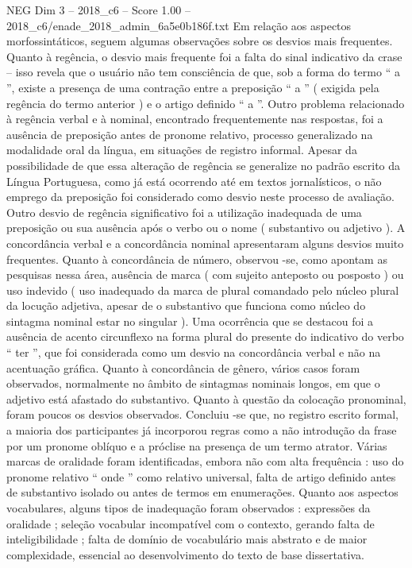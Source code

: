 \begin{textsample}{NEG Dim 3 – 2018\_c6 – Score 1.00 – 2018\_c6/enade\_2018\_admin\_6a5e0b186f.txt}
Em relação aos aspectos morfossintáticos, seguem algumas observações sobre os desvios mais frequentes.
Quanto à regência, o desvio mais frequente foi a falta do sinal indicativo da crase – isso revela que o usuário não tem consciência de que, sob a forma do termo “ a ”, existe a presença de uma contração entre a preposição “ a ” ( exigida pela regência do termo anterior ) e o artigo definido “ a ”.
Outro problema relacionado à regência verbal e à nominal, encontrado frequentemente nas respostas, foi a ausência de preposição antes de pronome relativo, processo generalizado na modalidade oral da língua, em situações de registro informal.
Apesar da possibilidade de que essa alteração de regência se generalize no padrão escrito da Língua Portuguesa, como já está ocorrendo até em textos jornalísticos, o não emprego da preposição foi considerado como desvio neste processo de avaliação.
Outro desvio de regência significativo foi a utilização inadequada de uma preposição ou sua ausência após o verbo ou o nome ( substantivo ou adjetivo ).
A concordância verbal e a concordância nominal apresentaram alguns desvios muito frequentes.
Quanto à concordância de número, observou -se, como apontam as pesquisas nessa área, ausência de marca ( com sujeito anteposto ou posposto ) ou uso indevido ( uso inadequado da marca de plural comandado pelo núcleo plural da locução adjetiva, apesar de o substantivo que funciona como núcleo do sintagma nominal estar no singular ).
Uma ocorrência que se destacou foi a ausência de acento circunflexo na forma plural do presente do indicativo do verbo “ ter ”, que foi considerada como um desvio na concordância verbal e não na acentuação gráfica.
Quanto à concordância de gênero, vários casos foram observados, normalmente no âmbito de sintagmas nominais longos, em que o adjetivo está afastado do substantivo.
Quanto à questão da colocação pronominal, foram poucos os desvios observados.
Concluiu -se que, no registro escrito formal, a maioria dos participantes já incorporou regras como a não introdução da frase por um pronome oblíquo e a próclise na presença de um termo atrator.
Várias marcas de oralidade foram identificadas, embora não com alta frequência : uso do pronome relativo “ onde ” como relativo universal, falta de artigo definido antes de substantivo isolado ou antes de termos em enumerações.
Quanto aos aspectos vocabulares, alguns tipos de inadequação foram observados : expressões da oralidade ; seleção vocabular incompatível com o contexto, gerando falta de inteligibilidade ; falta de domínio de vocabulário mais abstrato e de maior complexidade, essencial ao desenvolvimento do texto de base dissertativa.

\end{textsample}
